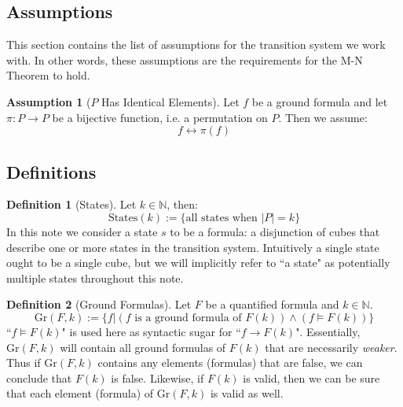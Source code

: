 \documentclass[12pt]{article}
\theoremstyle{definition}
\newtheorem{assumption}{Assumption}
\newtheorem{definition}{Definition}
\theoremstyle{remark}
\newcommand{\states}{\text{States}}
\newcommand{\gr}{\text{Gr}}
\begin{document}
\subsection{Assumptions}
This section contains the list of assumptions for the transition system we work with.  In other words, these assumptions are the requirements for the M-N Theorem to hold.

\begin{assumption}[$P$ Has Identical Elements]
  \label{asmp:ident}
  Let $f$ be a ground formula and let $\pi : P \to P$ be a bijective function, i.e. a permutation on $P$.  Then we assume:
  $$f \leftrightarrow \pi(f)$$
\end{assumption}

\subsection{Definitions}
\begin{definition}[States]
  Let $k \in \mathbb{N}$, then:
  $$\states(k) := \{\text{all states when } |P|=k\}$$
  In this note we consider a state $s$ to be a formula: a disjunction of cubes that describe one or more states in the transition system.  Intuitively a single state ought to be a single cube, but we will implicitly refer to ``a state" as potentially multiple states throughout this note.
\end{definition}

\begin{definition}[Ground Formulas]
  Let $F$ be a quantified formula and $k \in \mathbb{N}$.
  $$\gr(F,k) := \{f | (f \text{ is a ground formula of } F(k)) \land (f \models F(k))\}$$
  ``$f \models F(k)$" is used here as syntactic sugar for ``$f \rightarrow F(k)$".  Essentially, $\gr(F,k)$ will contain all ground formulas of $F(k)$ that are necessarily \textit{weaker}.  Thus if $\gr(F,k)$ contains any elements (formulas) that are false, we can conclude that $F(k)$ is false.  Likewise, if $F(k)$ is valid, then we can be sure that each element (formula) of $\gr(F,k)$ is valid as well.
\end{definition}
\end{document}
